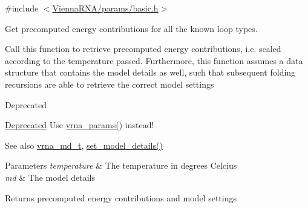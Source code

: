 {\ttfamily \#include $<$\mbox{\hyperlink{params_2basic_8h}{Vienna\+R\+N\+A/params/basic.\+h}}$>$}



Get precomputed energy contributions for all the known loop types. 

Call this function to retrieve precomputed energy contributions, i.\+e. scaled according to the temperature passed. Furthermore, this function assumes a data structure that contains the model details as well, such that subsequent folding recursions are able to retrieve the correct model settings

\begin{DoxyRefDesc}{Deprecated}
\item[\mbox{\hyperlink{deprecated__deprecated000148}{Deprecated}}]Use \mbox{\hyperlink{group__energy__parameters_gad0e3e7e74bdc50d1709d40c92993185e}{vrna\+\_\+params()}} instead!\end{DoxyRefDesc}


\begin{DoxySeeAlso}{See also}
\mbox{\hyperlink{group__model__details_ga1f8a10e12a0a1915f2a4eff0b28ea17c}{vrna\+\_\+md\+\_\+t}}, \mbox{\hyperlink{group__model__details_gabad896c3650d420f3f3ddefc69e2bceb}{set\+\_\+model\+\_\+details()}}
\end{DoxySeeAlso}

\begin{DoxyParams}{Parameters}
{\em temperature} & The temperature in degrees Celcius \\
\hline
{\em md} & The model details \\
\hline
\end{DoxyParams}
\begin{DoxyReturn}{Returns}
precomputed energy contributions and model settings 
\end{DoxyReturn}
